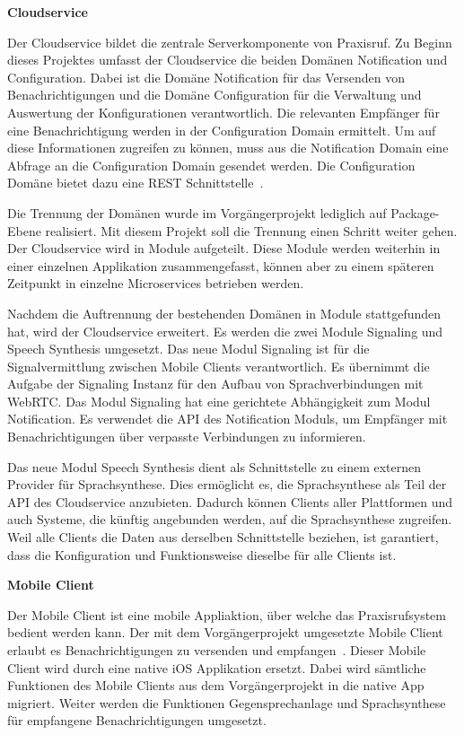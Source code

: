 \textbf{Cloudservice}

Der Cloudservice bildet die zentrale Serverkomponente von Praxisruf.
Zu Beginn dieses Projektes umfasst der Cloudservice die beiden Domänen Notification und Configuration.
Dabei ist die Domäne Notification für das Versenden von Benachrichtigungen und die Domäne Configuration für die Verwaltung und Auswertung der Konfigurationen verantwortlich.
Die relevanten Empfänger für eine Benachrichtigung werden in der Configuration Domain ermittelt.
Um auf diese Informationen zugreifen zu können, muss aus die Notification Domain eine Abfrage an die Configuration Domain gesendet werden.
Die Configuration Domäne bietet dazu eine REST Schnittstelle~\cite{ip5}.

Die Trennung der Domänen wurde im Vorgängerprojekt lediglich auf Package-Ebene realisiert.
Mit diesem Projekt soll die Trennung einen Schritt weiter gehen.
Der Cloudservice wird in Module aufgeteilt.
Diese Module werden weiterhin in einer einzelnen Applikation zusammengefasst, können aber zu einem späteren Zeitpunkt in einzelne Microservices betrieben werden.

Nachdem die Auftrennung der bestehenden Domänen in Module stattgefunden hat, wird der Cloudservice erweitert.
Es werden die zwei Module Signaling und Speech Synthesis umgesetzt.
Das neue Modul Signaling ist für die Signalvermittlung zwischen Mobile Clients verantwortlich.
Es übernimmt die Aufgabe der Signaling Instanz für den Aufbau von Sprachverbindungen mit WebRTC.
Das Modul Signaling hat eine gerichtete Abhängigkeit zum Modul Notification.
Es verwendet die API des Notification Moduls, um Empfänger mit Benachrichtigungen über verpasste Verbindungen zu informieren.

Das neue Modul Speech Synthesis dient als Schnittstelle zu einem externen Provider für Sprachsynthese.
Dies ermöglicht es, die Sprachsynthese als Teil der API des Cloudservice anzubieten.
Dadurch können Clients aller Plattformen und auch Systeme, die künftig angebunden werden, auf die Sprachsynthese zugreifen.
Weil alle Clients die Daten aus derselben Schnittstelle beziehen, ist garantiert, dass die Konfiguration und Funktionsweise dieselbe für alle Clients ist.

\textbf{Mobile Client}

Der Mobile Client ist eine mobile Appliaktion, über welche das Praxisrufsystem bedient werden kann.
Der mit dem Vorgängerprojekt umgesetzte Mobile Client erlaubt es Benachrichtigungen zu versenden und empfangen~\cite{ip5}.
Dieser Mobile Client wird durch eine native iOS Applikation ersetzt.
Dabei wird sämtliche Funktionen des Mobile Clients aus dem Vorgängerprojekt in die native App migriert.
Weiter werden die Funktionen Gegensprechanlage und Sprachsynthese für empfangene Benachrichtigungen umgesetzt.

